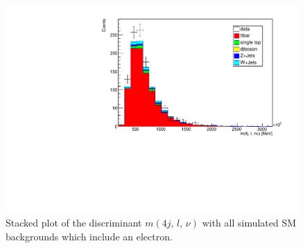 \begin{figure}[tb]
  \centering
  \includegraphics[width=.6\textwidth]{plots/comparism/m_event.pdf}
  \caption{Stacked plot of the discriminant $m(4j,\,l,\,\nu)$ with all simulated SM backgrounds which include an electron.}
  \label{fig:7}
\end{figure}



